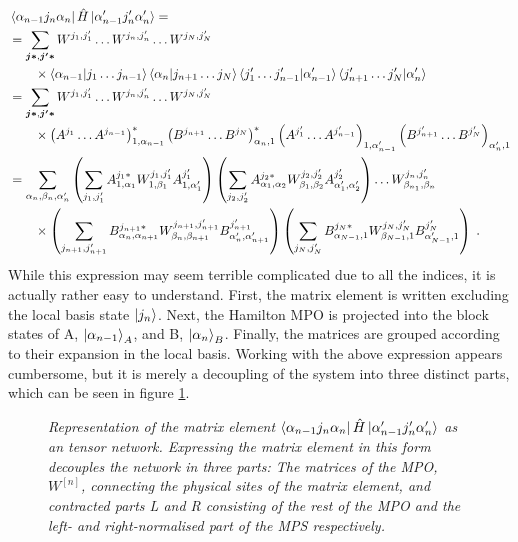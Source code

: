 \begin{align}
&	\bra{\alpha_{n-1} j_n \alpha_{n}} \hat{H} \ket{\alpha_{n-1} ' j_n ' \alpha_{n} '} = \nonumber \\
 &= \sum_{\boldsymbol{j *} , \boldsymbol{j' * }}  W^{j_1 , j_1 '} \ldots W^{j_n , j_n '} \ldots W^{j_N , j_N '} \nonumber \\
	& \qquad \times \braket{\alpha_{n-1} | j_1 \ldots j_{n-1}} \braket{\alpha_{n} | j_{n+1} \ldots j_{N}} \braket{j_1 ' \ldots j_{n-1} ' | \alpha_{n-1} '} \braket{j_{n+1} ' \ldots j_{N} ' | \alpha_{n} '} \nonumber \\
	&= \sum_{\boldsymbol{j *} , \boldsymbol{j' * }}  W^{j_1 , j_1 '} \ldots W^{j_n , j_n '} \ldots W^{j_N , j_N '} \nonumber \\
	& \qquad \times \left( A^{j_1} \ldots A^{j_{n-1}} \right)_{1 , \alpha_{n-1}}^{*} \left( B^{j_{n+1}} \ldots B^{j_{N}} \right)_{ \alpha_{n} , 1}^{*} \left( A^{j_1 '} \ldots A^{j_{n-1} '} \right)_{1 , \alpha_{n-1} '} \left( B^{j_{n+1} '} \ldots B^{j_{N} '} \right)_{ \alpha_{n} ' , 1} \nonumber \\
	&= \sum_{\alpha_n , \beta_n , \alpha_n '}
	\left( \sum_{j_1 , j_1 '} A_{1 , \alpha_1}^{j_1 *} W_{1, \beta_1}^{j_1 , j_1 '} A_{1 , \alpha_1 '}^{j_1 '} \right)
	\left( \sum_{j_2 , j_2 '} A_{\alpha_1 , \alpha_2}^{j_2 *} W_{\beta_1, \beta_2}^{j_2 , j_2 '} A_{\alpha_1 ' , \alpha_2 '}^{j_2 '} \right)
	\ldots W_{\beta_{n_1}, \beta_n}^{j_n , j_n '} \nonumber \\
	& \qquad \times \left( \sum_{j_{n+1} , j_{n+1} '} B_{\alpha_n , \alpha_{n+1}}^{j_{n+1} *} W_{\beta_n, \beta_{n+1}}^{j_{n+1} , j_{n+1} '} B_{\alpha_n ', \alpha_{n+1} '}^{j_{n+1} '} \right)
	\left( \sum_{j_{N} , j_{N} '} B_{\alpha_{N-1} , 1}^{j_{N} *} W_{\beta_{N-1}, 1}^{j_{N} , j_{N} '} B_{\alpha_{N-1}' , 1 }^{j_{N} '} \right)  \; .
\end{align}  
While this expression may seem terrible complicated due to all the indices, it is actually rather easy to understand. First, the matrix element is written excluding the local basis state $\ket{j_n}$. Next, the Hamilton MPO is projected into the block states of A, $\ket{\alpha_{n-1}}_A$, and B, $\ket{\alpha_{n}}_B$. Finally, the matrices are grouped according to their expansion in the local basis. Working with the above expression appears cumbersome, but it is merely a decoupling of the system into three distinct parts, which can be seen in figure \ref{fig:singleElemHamil}.
\begin{figure}[h!]
	\centering
	
	\caption{\textit{Representation of the matrix element $\bra{\alpha_{n-1} j_n \alpha_{n}} \hat{H} \ket{\alpha_{n-1} ' j_n ' \alpha_{n} '}$ as an tensor network. Expressing the matrix element in this form decouples the network in three parts: The matrices of the MPO, $W^{[n]}$, connecting the physical sites of the matrix element, and contracted parts L and R consisting of the rest of the MPO and the left- and right-normalised part of the MPS respectively.}}
	\label{fig:singleElemHamil}
\end{figure}
